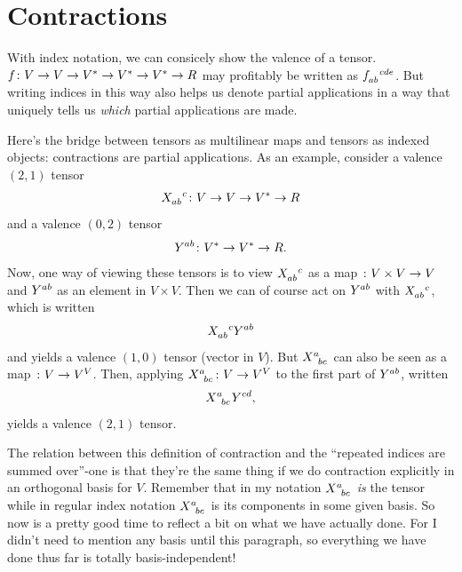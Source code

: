 \documentclass[english, 12pt]{article}
\begin{document}
\section{Contractions}%
\label{sec:contractions}

With index notation, we can consicely show the valence of a tensor.
$f \colon V \to V \to {V}^{\ast} \to {V}^{\ast} \to {V}^{\ast} \to R$ may profitably be written as $\tensor{f}{_{a b}^{c d e}}$.
But writing indices in this way also helps us denote partial applications in a way that uniquely tells us \emph{which} partial applications are made.

Here's the bridge between tensors as multilinear maps and tensors as indexed objects: contractions are partial applications.
As an example, consider a valence $(2, 1)$ tensor
\begin{align*}
	\tensor{X}{_a_b^c} \from V \to V \to \dual V \to R
\end{align*}
and a valence $(0, 2)$ tensor
\begin{align*}
	\tensor{Y}{^a^b} \from \dual V \to \dual V \to R.
\end{align*}
Now, one way of viewing these tensors is to view $\tensor{X}{_a_b^c}$ as a map $\colon V \times V \to V$ and $\tensor{Y}{^a^b}$ as an element in $V \times V$.
Then we can of course act on $\tensor{Y}{^a^b}$ with $\tensor{X}{_a_b^c}$,
which is written
\begin{align*}
	\tensor{X}{_a_b^c} \tensor{Y}{^a^b}
\end{align*}
and yields a valence $(1, 0)$ tensor (vector in $V$).
But $\tensor{X}{^a_b_c}$ can also be seen as a map $\colon V \to V^V$.
Then, applying $\tensor{X}{^a_b_c}\from V \to V^V$ to the first part of $\tensor{Y}{^a^b}$, written
\begin{align*}
	\tensor{X}{^a_b_c} \tensor{Y}{^c^d},
\end{align*}
yields a valence $(2, 1)$ tensor.

The relation between this definition of contraction and the \enquote{repeated indices are summed over}-one is that they're the same thing if we do contraction explicitly in an orthogonal basis for $V$.
Remember that in my notation $\tensor{X}{^a_b_c}$ \emph{is} the tensor while in regular index notation $\tensor{X}{^a_b_c}$ is its components in some given basis.
So now is a pretty good time to reflect a bit on what we have actually done.
For I didn't need to mention any basis until this paragraph, so everything we have done thus far is totally basis-independent!
\end{document}
